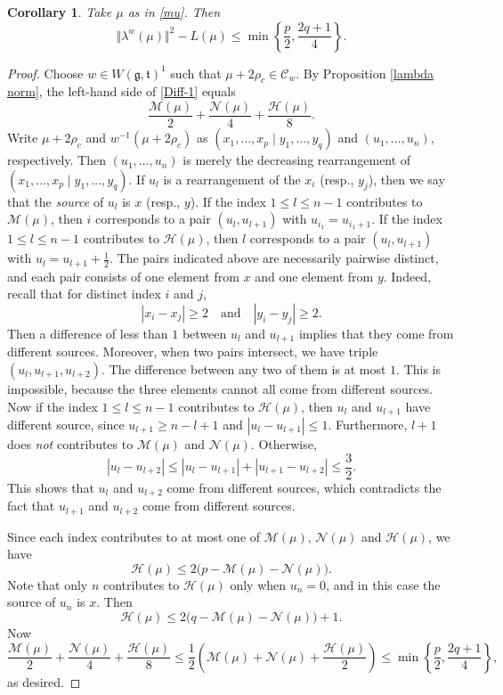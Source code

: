 \documentclass[11pt]{amsart}
\theoremstyle{plain}
\newtheorem{cor}[thm]{Corollary}
\theoremstyle{definition}
\newcommand{\mfg}{\mathfrak{g}}
\newcommand{\mft}{\mathfrak{t}}
\newcommand{\C}{\mathcal{C}}
\newcommand{\caH}{\mathcal{H}}
\newcommand{\caM}{\mathcal{M}}
\newcommand{\caN}{\mathcal{N}}
\newcommand{\N}{\mathcal{N}}
\begin{document}
\begin{cor}\label{co-lambda-L}
Take $\mu$ as in \eqref{mu}. Then
	\begin{equation}\label{Diff-1}
		\Vert \lambda^w(\mu)\Vert^2-L(\mu)\le \min\left\{\frac{p}{2},\frac{2q+1}{4}\right\}.
	\end{equation}
\end{cor}
\begin{proof}
	 	Choose $w\in W(\mfg,\mft)^1$ such that $\mu+2\rho_c\in \C_w$. By Proposition \ref{lambda norm}, the left-hand side of \eqref{Diff-1} equals
	\[\frac{\caM(\mu)}{2}+\frac{\caN(\mu)}{4}+\frac{\caH(\mu)}{8}.\]
	Write $\mu+2\rho_c$ and $w^{-1}(\mu+2\rho_c)$ as $(x_1,\dots,x_p\mid y_1,\dots,y_q)$ and $(u_1,\dots,u_n)$, respectively. Then $(u_1,\dots,u_n)$ is merely the decreasing rearrangement of $(x_1,\dots,x_p\mid y_1,\dots,y_q)$. If $u_l$ is a rearrangement of the $x_i$ (resp., $y_j$), then we say that the \emph{source} of $u_l$ is $x$ (resp., $y$).
	 If the index $1\le l\le n-1$ contributes to $\caM(\mu)$, then $i$ corresponds to a pair $(u_{l}, u_{l+1})$  with $u_{i_1}=u_{i_1+1}$. If the index $1\le l\le n-1$  contributes to $\caH(\mu)$, then $l$ corresponds to a pair $(u_{l}, u_{l+1})$ with $u_{l}=u_{l+1}+\frac{1}{2}$. The pairs indicated above are necessarily pairwise distinct, and each pair consists of one element from $x$ and one element from
	 $y$. Indeed, recall that for distinct index $i$ and $j$,
	 \[|x_i-x_j|\ge 2\quad\mbox{and}\quad |y_i-y_j|\ge 2.\]
	  Then a difference of less than $1$ between $u_l$ and $u_{l+1}$ implies that they come from different sources. Moreover, when two pairs intersect, we have triple $(u_l,u_{l+1},u_{l+2})$. The difference between any two of them is at most $1$. This is impossible, because the three elements cannot all come from different sources. Now if the index $1\le l\le n-1$  contributes to $\caH(\mu)$, then $u_l$ and $u_{l+1}$ have different source, since $u_{l+1}\ge n-l+1$ and $|u_l-u_{l+1}|\le 1$. Furthermore, $l+1$ does \emph{not} contributes to $\caM(\mu)$ and $\caN(\mu)$. Otherwise,
	  \[|u_l-u_{l+2}|\le |u_l-u_{l+1}|+|u_{l+1}-u_{l+2}|\le\frac{3}{2}.\]
	  This shows that $u_l$ and $u_{l+2}$ come from different sources, which contradicts the fact that $u_{l+1}$ and $u_{l+2}$ come from different sources.
	
	  Since each index contributes to at most one of $\caM(\mu)$, $\caN(\mu)$ and $\caH(\mu)$, we have
	  \[\caH(\mu)\le 2\big(p-\caM(\mu)-\caN(\mu)\big).\]
	   Note that only $n$ contributes to $\caH(\mu)$ only when $u_n=0$,  and in this case the source of $u_n$ is $x$.  Then
	   \[\caH(\mu)\le 2\big(q-\caM(\mu)-\caN(\mu)\big)+1.\]
	   Now
	   \[\frac{\caM(\mu)}{2}+\frac{\N(\mu)}{4}+\frac{\caH(\mu)}{8}\le \frac{1}{2}\left(\caM(\mu)+\N(\mu)+\frac{\caH(\mu)}{2}\right)\le \min\left\{\frac{p}{2},\frac{2q+1}{4}\right\},\]
	   as desired.
\end{proof}
\end{document}
